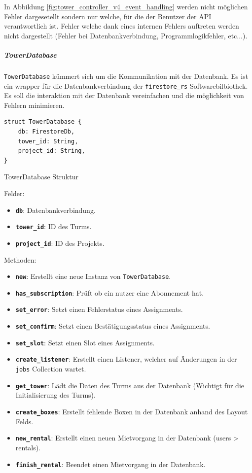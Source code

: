 In Abbildung \ref{fig:tower_controller_v4_event_handling} werden nicht möglichen Fehler dargesetellt sondern nur welche, für die der Benutzer der API verantwortlich ist. Fehler welche dank eines internen Fehlers auftreten werden nicht dargestellt (Fehler bei Datenbankverbindung, Programmlogikfehler, etc...).

\clearpage

\subparagraph{TowerDatabase}

\texttt{TowerDatabase} kümmert sich um die Kommunikation mit der Datenbank. Es ist ein \Gls{wrapper} für die Datenbankverbindung der \texttt{firestore\_rs} Softwarebilbiothek. Es soll die interaktion mit der Datenbank vereinfachen und die möglichkeit von Fehlern minimieren.

\begin{listing}[H]
  \begin{verbatim}
struct TowerDatabase {
    db: FirestoreDb,
    tower_id: String,
    project_id: String,
}
  \end{verbatim}
  \caption{TowerDatabase Struktur}
  \label{lst:tower_database_struktur}
\end{listing}

Felder:
\begin{itemize}
  \item \textbf{\texttt{db}}: Datenbankverbindung.
  \item \textbf{\texttt{tower\_id}}: ID des Turms.
  \item \textbf{\texttt{project\_id}}: ID des Projekts.
\end{itemize}

Methoden:
\begin{itemize}
  \item \textbf{\texttt{new}}: Erstellt eine neue Instanz von \texttt{TowerDatabase}.
  \item \textbf{\texttt{has\_subscription}}: Prüft ob ein nutzer eine Abonnement hat.
  \item \textbf{\texttt{set\_error}}: Setzt einen Fehlerstatus eines Assignments.
  \item \textbf{\texttt{set\_confirm}}: Setzt einen Bestätigungsstatus eines Assignments.
  \item \textbf{\texttt{set\_slot}}: Setzt einen Slot eines Assignments.
  \item \textbf{\texttt{create\_listener}}: Erstellt einen Listener, welcher auf Änderungen in der \texttt{jobs} Collection wartet.
  \item \textbf{\texttt{get\_tower}}: Lädt die Daten des Turms aus der Datenbank (Wichtigt für die Initialisierung des Turms).
  \item \textbf{\texttt{create\_boxes}}: Erstellt fehlende Boxen in der Datenbank anhand des Layout Felds.
  \item \textbf{\texttt{new\_rental}}: Erstellt einen neuen Mietvorgang in der Datenbank (users > rentals).
  \item \textbf{\texttt{finish\_rental}}: Beendet einen Mietvorgang in der Datenbank.
\end{itemize}


